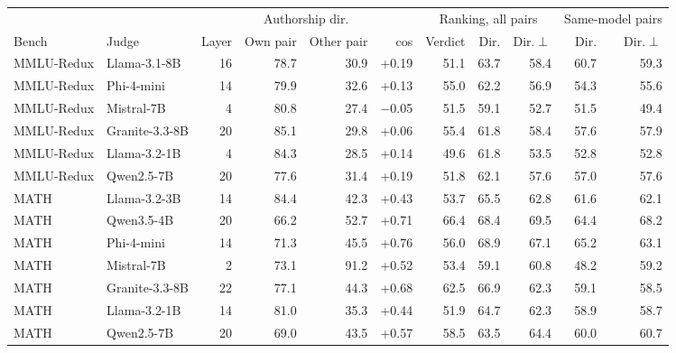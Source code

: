 \begin{tabular}{ll r rr r rrr rr}
\toprule
& & & \multicolumn{2}{c}{Authorship dir.} & & \multicolumn{3}{c}{Ranking, all pairs} & \multicolumn{2}{c}{Same-model pairs} \\
\cmidrule(lr){4-5}\cmidrule(lr){7-9}\cmidrule(l){10-11}
Bench & Judge & Layer & Own pair & Other pair & cos & Verdict & Dir. & Dir.$\perp$ & Dir. & Dir.$\perp$ \\
\midrule
MMLU-Redux & Llama-3.1-8B & 16 & 78.7 & 30.9 & +0.19 & 51.1 & 63.7 & 58.4 & 60.7 & 59.3 \\
MMLU-Redux & Phi-4-mini & 14 & 79.9 & 32.6 & +0.13 & 55.0 & 62.2 & 56.9 & 54.3 & 55.6 \\
MMLU-Redux & Mistral-7B & 4 & 80.8 & 27.4 & $-$0.05 & 51.5 & 59.1 & 52.7 & 51.5 & 49.4 \\
MMLU-Redux & Granite-3.3-8B & 20 & 85.1 & 29.8 & +0.06 & 55.4 & 61.8 & 58.4 & 57.6 & 57.9 \\
MMLU-Redux & Llama-3.2-1B & 4 & 84.3 & 28.5 & +0.14 & 49.6 & 61.8 & 53.5 & 52.8 & 52.8 \\
MMLU-Redux & Qwen2.5-7B & 20 & 77.6 & 31.4 & +0.19 & 51.8 & 62.1 & 57.6 & 57.0 & 57.6 \\
\midrule
MATH & Llama-3.2-3B & 14 & 84.4 & 42.3 & +0.43 & 53.7 & 65.5 & 62.8 & 61.6 & 62.1 \\
MATH & Qwen3.5-4B & 20 & 66.2 & 52.7 & +0.71 & 66.4 & 68.4 & 69.5 & 64.4 & 68.2 \\
MATH & Phi-4-mini & 14 & 71.3 & 45.5 & +0.76 & 56.0 & 68.9 & 67.1 & 65.2 & 63.1 \\
MATH & Mistral-7B & 2 & 73.1 & 91.2 & +0.52 & 53.4 & 59.1 & 60.8 & 48.2 & 59.2 \\
MATH & Granite-3.3-8B & 22 & 77.1 & 44.3 & +0.68 & 62.5 & 66.9 & 62.3 & 59.1 & 58.5 \\
MATH & Llama-3.2-1B & 14 & 81.0 & 35.3 & +0.44 & 51.9 & 64.7 & 62.3 & 58.9 & 58.7 \\
MATH & Qwen2.5-7B & 20 & 69.0 & 43.5 & +0.57 & 58.5 & 63.5 & 64.4 & 60.0 & 60.7 \\
\bottomrule
\end{tabular}
